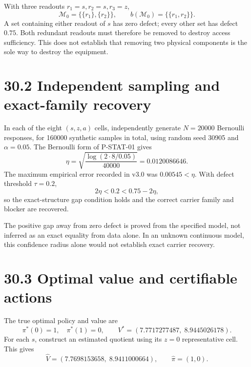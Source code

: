 \documentclass[
  english,
  11pt,
  oneside]{book}
\begin{document}
With three readouts \(r_1=s,r_2=s,r_3=z\), \[\mathcal M_0=\{\{r_1\},\{r_2\}\},\qquad
b(\mathcal M_0)=\{\{r_1,r_2\}\}.\] A set containing either readout of \(s\) has zero defect; every other set has defect \(0.75\). Both redundant readouts must therefore be removed to destroy access sufficiency. This does not establish that removing two physical components is the sole way to destroy the equipment.

\section{30.2 Independent sampling and exact-family recovery}\label{independent-sampling-and-exact-family-recovery}

In each of the eight \((s,z,a)\) cells, independently generate \(N=20000\) Bernoulli responses, for 160000 synthetic samples in total, using random seed 30905 and \(\alpha=0.05\). The Bernoulli form of P-STAT-01 gives \[\eta=\sqrt{\frac{\log(2\cdot8/0.05)}{40000}}
=0.0120086646.\] The maximum empirical error recorded in v3.0 was \(0.00545<\eta\). With defect threshold \(\tau=0.2\), \[2\eta<0.2<0.75-2\eta,\] so the exact-structure gap condition holds and the correct carrier family and blocker are recovered.

The positive gap away from zero defect is proved from the specified model, not inferred as an exact equality from data alone. In an unknown continuous model, this confidence radius alone would not establish exact carrier recovery.

\section{30.3 Optimal value and certifiable actions}\label{optimal-value-and-certifiable-actions}

The true optimal policy and value are \[\pi^*(0)=1,\quad\pi^*(1)=0,\qquad
V^*=(7.7717277487,\;8.9445026178).\] For each \(s\), construct an estimated quotient using its \(z=0\) representative cell. This gives \[\widehat V=(7.7698153658,\;8.9411000664),
\qquad \widehat\pi=(1,0).\]
\end{document}
